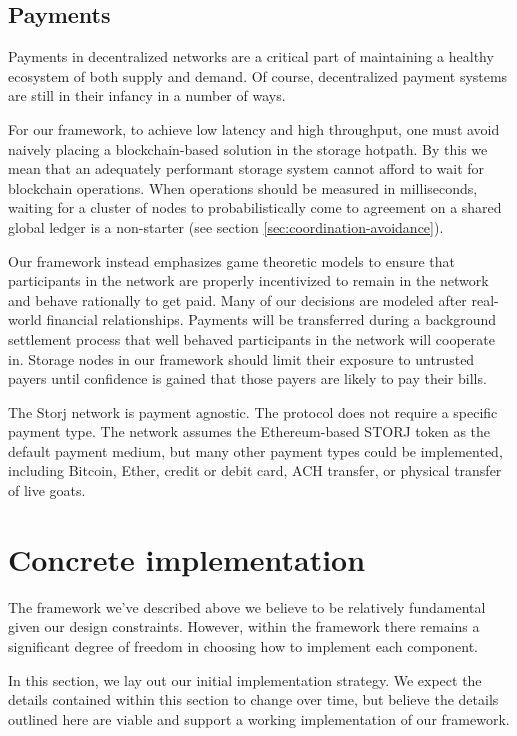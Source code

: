 \documentclass[11pt,fleqn,openany]{book}
\begin{document}
\section{Payments}

Payments in decentralized networks are a critical part of maintaining a healthy
ecosystem of both supply and demand. Of course, decentralized payment systems
are still in their infancy in a number of ways.

For our framework, to achieve low latency and high throughput, one must
avoid naively placing a blockchain-based solution in the storage hotpath.
By this we mean that an adequately performant storage system cannot afford to
wait for blockchain operations. When operations should be measured in
milliseconds, waiting for a cluster of nodes to probabilistically come to
agreement on a shared global ledger is a non-starter
(see section \ref{sec:coordination-avoidance}).

Our framework instead emphasizes game theoretic models to ensure
that participants in the network are properly incentivized to remain in the
network and behave rationally to get paid.
Many of our decisions are modeled after real-world financial relationships.
Payments will be transferred during
a background settlement process that well behaved participants in the network
will cooperate in. Storage nodes in our framework should limit their exposure
to untrusted payers until confidence is gained that those payers are likely
to pay their bills.

The Storj network is payment agnostic.
The protocol does not require a specific payment type.
The network assumes the Ethereum-based STORJ token as the default payment
medium, but many other payment types could be implemented, including Bitcoin,
Ether, credit or debit card, ACH transfer, or physical transfer of live goats.

\chapter{Concrete implementation}\label{chap:concrete}

The framework we've described above we believe to be relatively fundamental
given our design constraints. However, within the framework there remains a
significant degree of freedom in choosing how to implement each component.

In this section, we lay out our initial implementation strategy. We expect
the details contained within this section to change over time, but believe the
details outlined here are viable and support a working implementation of our
framework.
\end{document}

